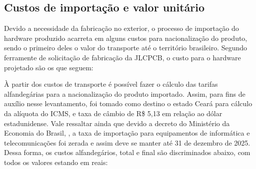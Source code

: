 \subsection{Custos de importação e valor unitário}

Devido a necessidade da fabricação no exterior, o processo de importação do hardware produzido acarreta em alguns custos para nacionalização do produto, sendo o primeiro deles o valor do transporte até o território brasileiro. Segundo ferramente de solicitação de fabricação da JLCPCB, o custo para o hardware projetado são os que seguem:

	\begin{table}[!h]
	\captionsetup{width=7cm}%
	\end{table}


À partir dos custos de transporte é possível fazer o cálculo das tarifas alfandegárias para a nacionalização do produto importado. Assim, para fins de auxílio nesse levantamento, foi tomado como destino o estado Ceará para cálculo da alíquota do \gls{ICMS}, e taxa de câmbio de R\$ 5,13 em relação ao dólar estadunidense. Vale ressaltar ainda que devido a decreto do Ministério da Economia do Brasil, , a taxa de importação para equipamentos de informática e telecomunicações foi zerada e assim deve se manter até 31 de dezembro de 2025. Dessa forma, os custos alfandegários, total e final são discriminados abaixo, com todos os valores estando em reais:


